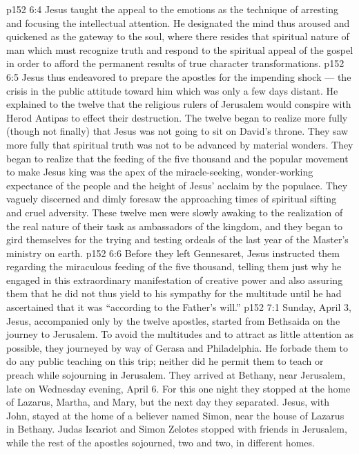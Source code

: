 \vs p152 6:4 \pc Jesus taught the appeal to the emotions as the technique of arresting and focusing the intellectual attention. He designated the mind thus aroused and quickened as the gateway to the soul, where there resides that spiritual nature of man which must recognize truth and respond to the spiritual appeal of the gospel in order to afford the permanent results of true character transformations.
\vs p152 6:5 Jesus thus endeavored to prepare the apostles for the impending shock --- the crisis in the public attitude toward him which was only a few days distant. He explained to the twelve that the religious rulers of Jerusalem would conspire with Herod Antipas to effect their destruction. The twelve began to realize more fully (though not finally) that Jesus was not going to sit on David’s throne. They saw more fully that spiritual truth was not to be advanced by material wonders. They began to realize that the feeding of the five thousand and the popular movement to make Jesus king was the apex of the miracle\hyp{}seeking, wonder\hyp{}working expectance of the people and the height of Jesus’ acclaim by the populace. They vaguely discerned and dimly foresaw the approaching times of spiritual sifting and cruel adversity. These twelve men were slowly awaking to the realization of the real nature of their task as ambassadors of the kingdom, and they began to gird themselves for the trying and testing ordeals of the last year of the Master’s ministry on earth.
\vs p152 6:6 \pc Before they left Gennesaret, Jesus instructed them regarding the miraculous feeding of the five thousand, telling them just why he engaged in this extraordinary manifestation of creative power and also assuring them that he did not thus yield to his sympathy for the multitude until he had ascertained that it was “according to the Father’s will.”
\vs p152 7:1 Sunday, April 3, Jesus, accompanied only by the twelve apostles, started from Bethsaida on the journey to Jerusalem. To avoid the multitudes and to attract as little attention as possible, they journeyed by way of Gerasa and Philadelphia. He forbade them to do any public teaching on this trip; neither did he permit them to teach or preach while sojourning in Jerusalem. They arrived at Bethany, near Jerusalem, late on Wednesday evening, April 6. For this one night they stopped at the home of Lazarus, Martha, and Mary, but the next day they separated. Jesus, with John, stayed at the home of a believer named Simon, near the house of Lazarus in Bethany. Judas Iscariot and Simon Zelotes stopped with friends in Jerusalem, while the rest of the apostles sojourned, two and two, in different homes.
